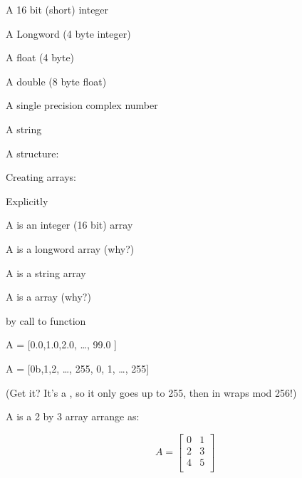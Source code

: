 \documentclass{article}
\begin{document}

     A 16 bit (short) integer


     A Longword (4 byte integer)


     A float (4 byte)

  
     A double (8 byte float)


     A single precision complex number


     A string


     A structure:



  \item Creating arrays:
  
     \bi
	\item Explicitly
	  
	
	    A is an integer (16 bit) array
    

            A is a longword array (why?)



	    A is a string array


	
	    A is a  array (why?)

	
	\item by call to function


		A = [0.0,1.0,2.0, \ldots , 99.0 ]


	        A = [0b,1,2, \ldots, 255, 0, 1, \ldots, 255]

	        (Get it? It's a , so it only goes up to
                255, then in wraps mod 256!)


	    A is a 2 by 3 array arrange as:

	\[ A = \left[ \begin{array}{ccc}
            0 & 1\\
            2 & 3\\
            4 & 5\\
	\end{array} \right] \]
\end{document}
